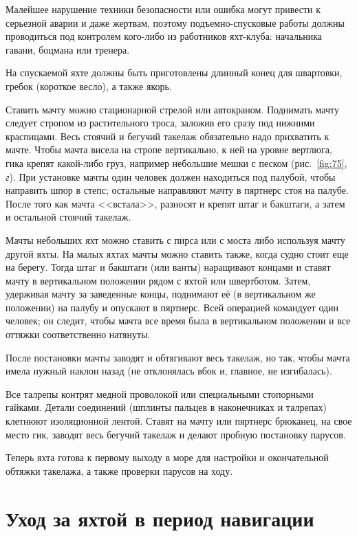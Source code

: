\documentclass[a4paper, 12pt, twoside, final]{scrbook}
\begin{document}
Малейшее нарушение техники безопасности или ошибка могут привести к серьезной аварии и даже жертвам, поэтому подъемно-спусковые работы должны проводиться под контролем кого-либо из работников яхт-клуба: начальника гавани, боцмана или тренера. 

На спускаемой яхте должны быть приготовлены длинный конец для швартовки, гребок (короткое весло), а также якорь. 

Ставить мачту можно стационарной стрелой или автокраном. Поднимать мачту следует стропом из растительного троса, заложив его сразу под нижними краспицами. Весь стоячий и бегучий такелаж обязательно надо прихватить к мачте. Чтобы мачта висела на стропе вертикально, к ней на уровне вертлюга, гика крепят какой-либо груз, например небольшие мешки с песком (рис.~\ref{fig:75}, \textit{г}). При установке мачты один человек должен находиться под палубой, чтобы направить шпор в степс; остальные направляют мачту в пяртнерс стоя на палубе. После того как мачта <<встала>>, разносят и крепят штаг и бакштаги, а затем и остальной стоячий такелаж. 

Мачты небольших яхт можно ставить с пирса или с моста либо используя мачту другой яхты. На малых яхтах мачты можно ставить также, когда судно стоит еще на берегу. Тогда штаг и бакштаги (или ванты) наращивают концами и ставят мачту в вертикальном положении рядом с яхтой или швертботом. Затем, удерживая мачту за заведенные концы, поднимают её (в вертикальном же положении) на палубу и опускают в пяртнерс. Всей операцией командует один человек; он следит, чтобы мачта все время была в вертикальном положении и все оттяжки соответственно натянуты. 

После постановки мачты заводят и обтягивают весь такелаж, но так, чтобы мачта имела нужный наклон назад (не отклонялась вбок и, главное, не изгибалась).

Все талрепы контрят медной проволокой или специальными стопорными гайками. Детали соединений (шплинты пальцев в наконечниках и талрепах) клетнюют изоляционной лентой. Ставят на мачту или пяртнерс брюканец, на свое место гик, заводят весь бегучий такелаж и делают пробную постановку парусов.

Теперь яхта готова к первому выходу в море для настройки и окончательной обтяжки такелажа, а также проверки парусов на ходу.

\section{Уход за яхтой в период навигации}
\end{document}
